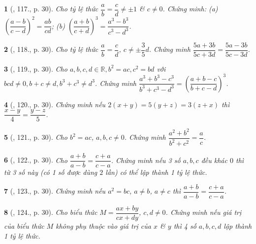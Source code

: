 \documentclass{article}
\newtheorem{baitoan}{}
\begin{document}
\begin{baitoan}[\cite{Tuyen_Toan_7}, 117., p. 30]
	Cho tỷ lệ thức $\dfrac{a}{b} = \dfrac{c}{d}\ne\pm 1$ \& $c\ne 0$. Chứng minh: (a) $\left(\dfrac{a - b}{c - d}\right)^2 = \dfrac{ab}{cd}$;
	(b) $\left(\dfrac{a + b}{c + d}\right)^3 = \dfrac{a^3 - b^3}{c^3 - d^3}$.	
\end{baitoan}

\begin{baitoan}[\cite{Tuyen_Toan_7}, 118., p. 30]
	Cho tỷ lệ thức $\dfrac{a}{b} = \dfrac{c}{d}$, $c\ne\pm\dfrac{3}{5}d$. Chứng minh $\dfrac{5a + 3b}{5c + 3d} = \dfrac{5a - 3b}{5c - 3d}$.
\end{baitoan}

\begin{baitoan}[\cite{Tuyen_Toan_7}, 119., p. 30]
	Cho $a,b,c,d\in\mathbb{R},b^2 = ac,c^2 = bd$ với $bcd\ne 0,b + c\ne d,b^3 + c^3\ne d^3$. Chứng minh $\dfrac{a^3 + b^3 - c^3}{b^3 + c^3 - d^3} = \left(\dfrac{a + b - c}{b + c - d}\right)^3$.
\end{baitoan}

\begin{baitoan}[\cite{Tuyen_Toan_7}, 120., p. 30]
	Chứng minh nếu $2(x + y) = 5(y + z) = 3(z + x)$ thì $\dfrac{x - y}{4} = \dfrac{y - z}{5}$.
\end{baitoan}

\begin{baitoan}[\cite{Tuyen_Toan_7}, 121., p. 30]
	Cho $b^2 = ac$, $a,b,c\ne 0$. Chứng minh $\dfrac{a^2 + b^2}{b^2 + c^2} = \dfrac{a}{c}$.
\end{baitoan}

\begin{baitoan}[\cite{Tuyen_Toan_7}, 122., p. 30]
	Cho $\dfrac{a + b}{a - b} = \dfrac{c + a}{c - a}$. Chứng minh nếu 3 số $a,b,c$ đều khác $0$ thì từ 3 số này (có 1 số được dùng $2$ lần) có thể lập thành 1 tỷ lệ thức.
\end{baitoan}

\begin{baitoan}[\cite{Tuyen_Toan_7}, 123., p. 30]
	Chứng minh nếu $a^2 = bc$, $a\ne b$, $a\ne c$ thì $\dfrac{a + b}{a - b} = \dfrac{c + a}{c - a}$.
\end{baitoan}

\begin{baitoan}[\cite{Tuyen_Toan_7}, 124., p. 30]
	Cho biểu thức $M = \dfrac{ax + by}{cx + dy}$, $c,d\ne 0$. Chứng minh nếu giá trị của biểu thức $M$ không phụ thuộc vào giá trị của $x$ \& $y$ thì 4 số $a,b,c,d$ lập thành 1 tỷ lệ thức.
\end{baitoan}
\end{document}
